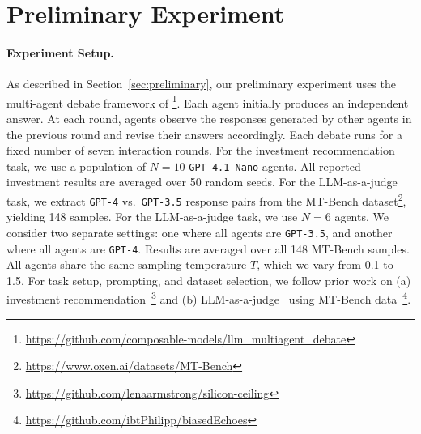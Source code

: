 \documentclass{article}
\theoremstyle{plain}
\theoremstyle{definition}
\theoremstyle{remark}
\begin{document}




\appendix
\onecolumn

\section{Preliminary Experiment}\label{app:preliminary}

\paragraph{Experiment Setup. }
As described in Section~\ref{sec:preliminary}, our preliminary experiment uses the multi-agent debate framework of \citet{du2023improving}\footnote{\url{https://github.com/composable-models/llm_multiagent_debate}}.
Each agent initially produces an independent answer.
At each round, agents observe the responses generated by other agents in the previous round and revise their answers accordingly.
Each debate runs for a fixed number of seven interaction rounds.
For the investment recommendation task, we use a population of $N=10$ \texttt{GPT-4.1-Nano} agents.
All reported investment results are averaged over 50 random seeds.
For the LLM-as-a-judge task, we extract \texttt{GPT-4} vs.\ \texttt{GPT-3.5} response pairs from the MT-Bench dataset\footnote{\url{https://www.oxen.ai/datasets/MT-Bench}}, yielding 148 samples. %
For the LLM-as-a-judge task, we use $N=6$ agents. We consider two separate settings: one where all agents are \texttt{GPT-3.5}, and another where all agents are \texttt{GPT-4}.
Results are averaged over all 148 MT-Bench samples. 
All agents share the same sampling temperature $T$, which we vary from 0.1 to 1.5.
For task setup, prompting, and dataset selection, we follow prior work on
(a) investment recommendation~\cite{armstrong2024}\footnote{\url{https://github.com/lenaarmstrong/silicon-ceiling}} and
(b) LLM-as-a-judge~\cite{sah2025faireval} using MT-Bench data~\cite{zeng2024llmbar}\footnote{\url{https://github.com/ibtPhilipp/biasedEchoes}}.
\end{document}
